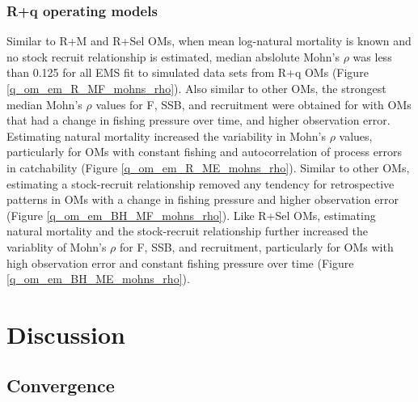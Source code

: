 \documentclass[
  12pt,
]{article}
\begin{document}
\hypertarget{rq-operating-models-4}{%
\subsubsection*{R+q operating models}\label{rq-operating-models-4}}

Similar to R+M and R+Sel OMs, when mean log-natural mortality is known
and no stock recruit relationship is estimated, median abslolute Mohn's
\(\rho\) was less than 0.125 for all EMS fit to simulated data sets from
R+q OMs (Figure \ref{q_om_em_R_MF_mohns_rho}). Also similar to other
OMs, the strongest median Mohn's \(\rho\) values for F, SSB, and
recruitment were obtained for with OMs that had a change in fishing
pressure over time, and higher observation error. Estimating natural
mortality increased the variability in Mohn's \(\rho\) values,
particularly for OMs with constant fishing and autocorrelation of
process errors in catchability (Figure \ref{q_om_em_R_ME_mohns_rho}).
Similar to other OMs, estimating a stock-recruit relationship removed
any tendency for retrospective patterns in OMs with a change in fishing
pressure and higher observation error (Figure
\ref{q_om_em_BH_MF_mohns_rho}). Like R+Sel OMs, estimating natural
mortality and the stock-recruit relationship further increased the
variablity of Mohn's \(\rho\) for F, SSB, and recruitment, particularly
for OMs with high observation error and constant fishing pressure over
time (Figure \ref{q_om_em_BH_ME_mohns_rho}).

\hypertarget{discussion}{%
\section*{Discussion}\label{discussion}}

\hypertarget{convergence}{%
\subsection*{Convergence}\label{convergence}}
\end{document}

